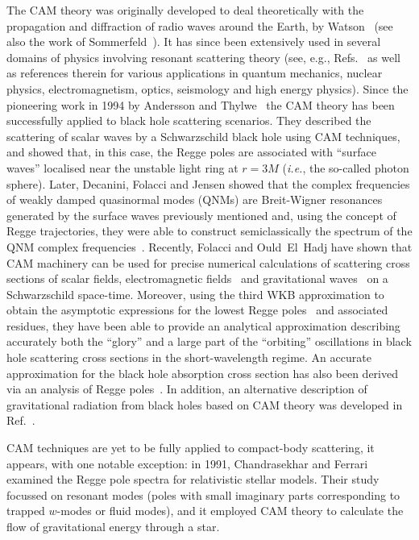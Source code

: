 \documentclass[aps,prd,longbibliography,reprint,twocolumn,amsmath,amssymb,amsfonts,showpacs,footnote,superscriptaddress]{revtex4-1}%
\begin{document}
The CAM theory was originally developed to deal theoretically with the propagation and diffraction of radio waves around the Earth, by Watson~\cite{Watson18} (see also the work of Sommerfeld~\cite{Sommerfeld49}). It has since been extensively used in several domains of physics involving resonant scattering theory (see, e.g., Refs.~\cite{deAlfaro:1965zz,Newton:1982qc,Watson18,Sommerfeld49,Nussenzveig:2006,Grandy2000,Uberall1992,AkiRichards2002,AkiRichards2002,Gribov69,
Collins77,BaronePredazzi2002,DonnachieETAL2005} as well as references therein for various applications in quantum mechanics, nuclear physics, electromagnetism, optics, seismology and high energy physics). Since the pioneering work in 1994 by Andersson and Thylwe~\cite{Andersson:1994rk,Andersson:1994rm} the CAM theory has been successfully applied to black hole scattering scenarios. They described the scattering of scalar waves by a Schwarzschild black hole using CAM techniques, and showed that, in this case, the Regge poles are associated with ``surface waves'' localised near the unstable light ring at $ r = 3M $ (\textit{i.e.}, the so-called photon sphere). Later, Decanini, Folacci and Jensen showed that the complex frequencies of weakly damped quasinormal modes (QNMs) are Breit-Wigner resonances generated by the surface waves previously mentioned and, using the concept of Regge trajectories, they were able to construct semiclassically the spectrum of the QNM complex frequencies~\cite{Decanini:2002ha}. Recently, Folacci and Ould~El~Hadj have shown that CAM machinery can be used for precise numerical calculations of scattering cross sections of scalar fields, electromagnetic fields~\cite{Folacci:2019cmc} and gravitational waves~\cite{Folacci:2019vtt} on a Schwarzschild space-time. Moreover, using the third WKB approximation to obtain the asymptotic expressions for the lowest Regge poles~\cite{Decanini:2009mu} and associated residues, they have been able to provide an analytical approximation describing accurately both the ``glory'' and a large part of the ``orbiting'' oscillations in black hole scattering cross sections in the short-wavelength regime. An accurate approximation for the black hole absorption cross section has also been derived via an analysis of Regge poles~\cite{Decanini:2011xi,Decanini:2011xw}. In addition, an alternative description of gravitational radiation from black holes based on CAM theory was developed in Ref.~\cite{Folacci:2018sef}.

CAM techniques are yet to be fully applied to compact-body scattering, it appears, with one notable exception: in 1991, Chandrasekhar and Ferrari \cite{ChandrasekharIV:1992ey} examined the Regge pole spectra for relativistic stellar models.
Their study focussed on resonant modes (poles with small imaginary parts corresponding to trapped $w$-modes or fluid modes), and it employed CAM theory to calculate the flow of gravitational energy through a star. %
\end{document}
